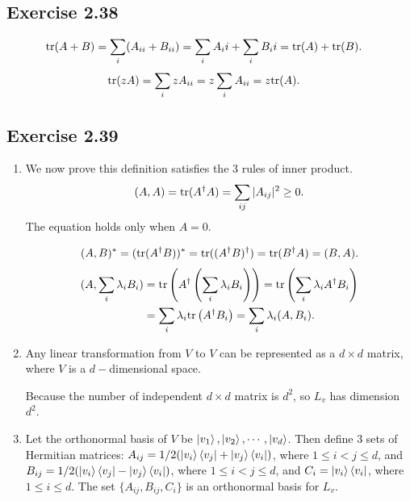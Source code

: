 \subsection*{Exercise 2.38}
\begin{align}
{\rm tr}(A+B)&=\sum_i(A_{ii}+B_{ii})=\sum_i A_ii + \sum_i B_ii = {\rm tr}(A)+{\rm tr}(B).
\end{align}
\begin{align}
{\rm tr}(zA)&=\sum_izA_{ii}=z\sum_i A_{ii}=z {\rm tr}(A).
\end{align}

\subsection*{Exercise 2.39}

\begin{enumerate}[(1)]
\item We now prove this definition satisfies the 3 rules of inner product.
\begin{align}
(A,A)={\rm tr}(A^\dagger A)=\sum_{ij}|A_{ij}|^2\geq 0.
\end{align}
The equation holds only when $A = 0$.

\begin{align}
(A,B)^*=({\rm tr}(A^\dagger B))^*={\rm tr}((A^\dagger B)^\dagger)={\rm tr}(B^\dagger A)=(B,A).
\end{align}
\begin{align}
(A,\sum_i \lambda_i B_i)&={\rm tr}\left(A^\dagger \left(\sum_i \lambda_i B_i\right)\right)={\rm tr}\left(\sum_i \lambda_i A^\dagger B_i\right)\\
&=\sum_i \lambda_i{\rm tr}\left( A^\dagger B_i\right)=\sum_i \lambda_i(A,B_i).
\end{align}

\item 
Any linear transformation from $V$ to $V$ can be represented as a $d \times d$ matrix, where $V$ is a $d-$dimensional space.

Because the number of independent $d\times d$ matrix is $d^2$, so $L_v$ has dimension $d^2$.

\item Let the orthonormal basis of $V$ be $\ket{v_1},\ket{v_2},\cdots,\ket{v_d}$. Then define 3 sets of Hermitian matrices: $A_{ij} = 1/2(\ket{v_i}\bra{v_j}+\ket{v_j}\bra{v_i})$, where $1\leq i<j\leq d$, and
$B_{ij}=1/2(\ket{v_i}\bra{v_j}-\ket{v_j}\bra{v_i})$, where $1\leq i<j\leq d$, and $C_i=\ket{v_i}\bra{v_i}$, where $1\leq i\leq d$. The set $\{A_{ij},B_{ij},C_i\}$ is an orthonormal basis for $L_v$.

\end{enumerate} 

